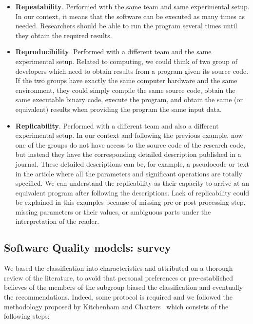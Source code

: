 \begin{itemize}
    \item \textbf{Repeatability}. Performed with the same team and same experimental setup. In our context, it means that the software can be executed as many times as needed. Researchers should be able to run the program several times until they obtain the required results.
    
    \item \textbf{Reproducibility}. Performed with a different team and the same experimental setup. Related to computing, we could think of two group of developers which need to obtain results from a program given its source code. If the two groups have exactly the same computer hardware and the same environment, they could simply compile the same source code, obtain the same executable binary code, execute the program, and obtain the same (or equivalent) results when providing the program the same input data.

    \item \textbf{Replicability}. Performed with a different team and also a different experimental setup. In our context and following the previous example, now one of the groups do not have access to the source code of the research code, but instead they have the corresponding detailed description published in a journal. These detailed descriptions can be, for example, a pseudocode or text in the article where all the parameters and significant operations are totally specified. We can understand the replicability as their capacity to arrive at an equivalent program after following the descriptions. Lack of replicability could be explained in this examples because of missing pre or post processing step, missing parameters or their values, or ambiguous parts under the interpretation of the reader.
\end{itemize}

\subsection{Software Quality models: survey}
We based the classification into characteristics and attributed on a thorough review of the literature, to avoid that personal preferences or pre-established believes of the members of the subgroup biased the classification and eventually the recommendations. Indeed, some protocol is required and we followed the methodology proposed by Kitchenham and Charters~\cite{keele2007guidelines} which consists of the following steps:

